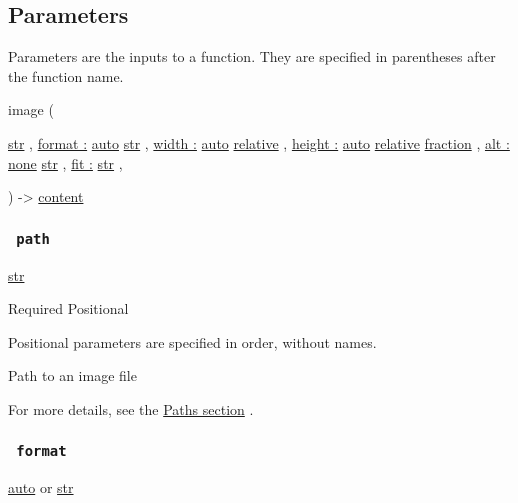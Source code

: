 \subsection{\texorpdfstring{{ Parameters
}}{ Parameters }}\label{parameters}

\label{parameters-tooltip}
Parameters are the inputs to a function. They are specified in
parentheses after the function name.

{ image } (

{ \href{/docs/reference/foundations/str/}{str} , } {
\hyperref[parameters-format]{format :}
\href{/docs/reference/foundations/auto/}{auto}
\href{/docs/reference/foundations/str/}{str} , } {
\hyperref[parameters-width]{width :}
\href{/docs/reference/foundations/auto/}{auto}
\href{/docs/reference/layout/relative/}{relative} , } {
\hyperref[parameters-height]{height :}
\href{/docs/reference/foundations/auto/}{auto}
\href{/docs/reference/layout/relative/}{relative}
\href{/docs/reference/layout/fraction/}{fraction} , } {
\hyperref[parameters-alt]{alt :}
\href{/docs/reference/foundations/none/}{none}
\href{/docs/reference/foundations/str/}{str} , } {
\hyperref[parameters-fit]{fit :}
\href{/docs/reference/foundations/str/}{str} , }

) -\textgreater{} \href{/docs/reference/foundations/content/}{content}

\subsubsection{\texorpdfstring{\texttt{\ path\ }}{ path }}\label{parameters-path}

\href{/docs/reference/foundations/str/}{str}

{Required} {{ Positional }}

\label{parameters-path-positional-tooltip}
Positional parameters are specified in order, without names.

Path to an image file

For more details, see the \href{/docs/reference/syntax/\#paths}{Paths
section} .

\subsubsection{\texorpdfstring{\texttt{\ format\ }}{ format }}\label{parameters-format}

\href{/docs/reference/foundations/auto/}{auto} {or}
\href{/docs/reference/foundations/str/}{str}

